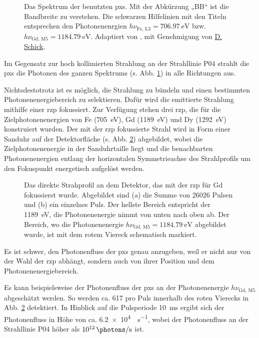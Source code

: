 \begin{figure}[H]
    \centering
    
    \caption{Das Spektrum der benutzten \gls{pxs}. Mit der Abkürzung „BB“ ist die Bandbreite zu verstehen. Die schwarzen Hilfelinien mit den Titeln entsprechen den Photonenenrgien $h\nu_{\text{Fe, L3}} = \SI{706.97}{\eV}$ bzw. $h\nu_{\text{Gd, M5}} = \SI{1184,79}{\eV}$. Adaptiert von \cite{schick_laser-driven_2021}, mit Genehmigung von \href{https://orcid.org/0000-0001-7988-6489}{D. Schick}.}
    \label{fig:pxs_spectrum}
\end{figure}
\noindent
Im Gegensatz zur hoch kollimierten Strahlung an der Strahllinie P04 strahlt die \gls{pxs} die Photonen des ganzen Spektrums (s. Abb. \ref{fig:pxs_spectrum}) in alle Richtungen aus.

\noindent
Nichtsdestotrotz ist es möglich, die Strahlung zu bündeln und einen bestimmten Photonenenergiebereich zu selektieren. Dafür wird die emittierte Strahlung mithilfe einer \gls{rzp} fokussiert. Zur Verfügung stehen drei \gls{rzp}, die für die Zielphotonenenergien von Fe (\SI{705}{\eV}), Gd (\SI{1189}{\eV}) und Dy (\SI{1292}{\eV}) konstruiert wurden. Der mit der \gls{rzp} fokussierte Strahl wird in Form einer Sanduhr auf der Detektorfläche (s. Abb. \ref{fig:butterfly_moench}) abgebildet, wobei die Zielphotonenenergie in der Sanduhrtaille liegt und die benachbarten Photonenenergien entlang der horizontalen Symmetrieachse des Strahlprofils um den Fokuspunkt energetisch aufgelöst werden.
\begin{figure}[H]
    \centering
    
    \label{fig:butterfly_moench_sum}
    \caption{Das direkte Strahprofil an dem Detektor, das mit der \gls{rzp} für Gd fokussierst wurde. Abgebildet sind (a) die Summe von 26026 Pulsen und (b) ein einzelnes Puls. Der hellste Bereich entspricht der \SI{1189}{\eV}, die Photonenenergie nimmt von unten nach oben ab. Der Bereich, wo die Photonenenergie $h\nu_{\text{Gd, M5}} = \SI{1184,79}{\eV}$ abgebildet wurde, ist mit dem rotem Viereck schematisch markiert.}
    \label{fig:butterfly_moench}
\end{figure}
\noindent
Es ist schwer, den Photonenfluss der \gls{pxs} genau anzugeben, weil er nicht nur von der Wahl der \gls{rzp} abhängt, sondern auch von ihrer Position und dem  Photonenenergiebereich.

\noindent
Es kann beispielsweise der Photonenfluss der \gls{pxs} an der Photonenenergie $h\nu_\text{Gd, M5}$ abgeschätzt werden. So werden ca. \SI{617}{\photons} pro Puls innerhalb des roten Vierecks in Abb. \ref{fig:butterfly_moench} detektiert. In Hinblick auf die Pulsperiode \SI{10}{\milli\second} ergibt sich der Photonenfluss in Höhe von ca. \SI{6.2e4}{\photons\per\second}, wobei der Photonenfluss an der Strahllinie P04 höher als $\SI{1e12}{\photons\per\second}$ ist.

